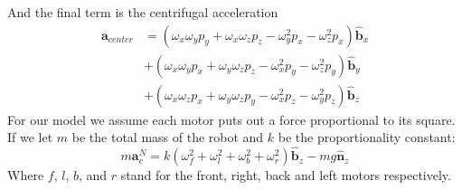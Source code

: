 \documentclass[lettersize,journal]{IEEEtran}
\begin{document}
And the final term is the centrifugal acceleration
\begin{align}
  \mathbf{a}_{center}
  &= \left(\omega_x\omega_yp_y+\omega_x\omega_zp_z-\omega_y^2p_x-\omega_z^2p_x\right) \mathbf{\hat{b}}_x \nonumber \\
  &+ \left(\omega_x\omega_yp_x+\omega_y\omega_zp_z-\omega_x^2p_y-\omega_z^2p_y\right) \mathbf{\hat{b}}_y \nonumber \\
  &+ \left(\omega_x\omega_zp_x+\omega_y\omega_zp_y-\omega_x^2p_z-\omega_y^2p_z\right) \mathbf{\hat{b}}_z
\end{align}
For our model we assume each motor puts out a force proportional to its square.
If we let $m$ be the total mass of the robot and $k$ be the proportionality constant:
\begin{equation}
  m\mathbf{a}^N_c = k \left(\omega_f^2 + \omega_l^2 + \omega_b^2 + \omega_r^2\right) \mathbf{\hat{b}}_z - mg \mathbf{\hat{n}}_z \label{EQN:LinearEOM}
\end{equation}
Where $f$, $l$, $b$, and $r$ stand for the front, right, back and left motors respectively. 
\end{document}

